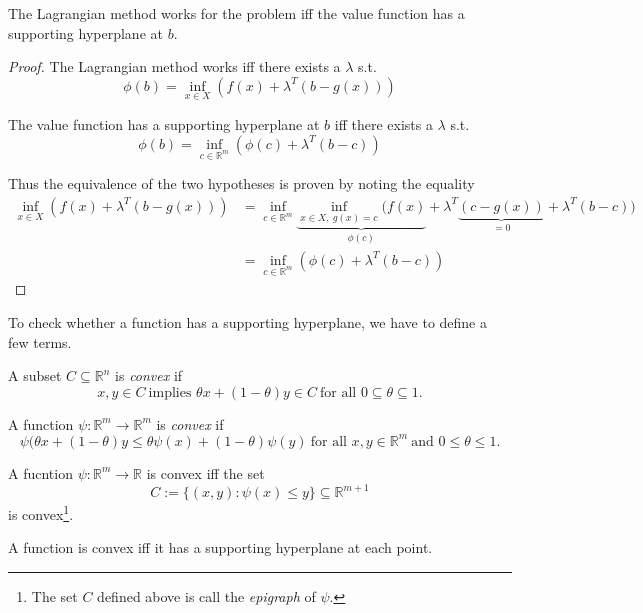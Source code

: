 \documentclass[a4paper]{article}
\begin{document}
\begin{thm}
  The Lagrangian method works for the problem iff the value function has a supporting hyperplane at $b$.
\end{thm}

\begin{proof}
  The Lagrangian method works iff there exists a $\lambda$ s.t.
  \[
   \phi(b) = \inf_{x \in X} (f(x) + \lambda^T (b - g(x)))
  \]

  The value function has a supporting hyperplane at $b$ iff there exists a $\lambda$ s.t.
  \[
   \phi(b) = \inf_{c \in \mathbb{R}^m} (\phi(c) + \lambda^T (b - c))
  \]

  Thus the equivalence of the two hypotheses is proven by noting the equality
  \begin{align*}
    \inf_{x \in X} (f(x) + \lambda^T (b - g(x))) &= \inf_{c \in \mathbb{R}^m} \underbrace{\inf_{x \in X,\: g(x) = c} (f(x)}_{\phi(c)} + \lambda^T \underbrace{(c - g(x))}_{= 0} + \lambda^T (b - c)) \\
                                         &= \inf_{c \in \mathbb{R}^m} (\phi(c) + \lambda^T (b - c))
  \end{align*}
\end{proof}

To check whether a function has a supporting hyperplane, we have to define a few terms.

\begin{defi}
  A subset $C \subseteq \mathbb{R}^n$ is \emph{convex} if
  \[
    x, y \in C \: \text{implies } \theta x + (1 - \theta)y \in C \: \text{for all } 0 \subseteq \theta \subseteq 1.
  \]
\end{defi}

\begin{defi}
  A function $\psi: \mathbb{R}^m \rightarrow \mathbb{R}^m$ is \emph{convex} if
  \[
    \psi(\theta x + (1 - \theta) y \leq \theta\psi(x) + (1-\theta) \psi(y) \: \text{for all } x, y \in \mathbb{R}^m \: \text{and } 0 \leq \theta \leq 1.
  \]
\end{defi}

\begin{cor}
  A fucntion $\psi : \mathbb{R}^m \rightarrow \mathbb{R}$ is convex iff the set
  \[
    C := \{(x, y) : \psi(x) \leq y \} \subseteq \mathbb{R}^{m + 1}
  \]
  is convex\footnote{The set $C$ defined above is call the \emph{epigraph} of $\psi$.}.
\end{cor}

\begin{thm}
  A function is convex iff it has a supporting hyperplane at each point.
\end{thm}
\end{document}
